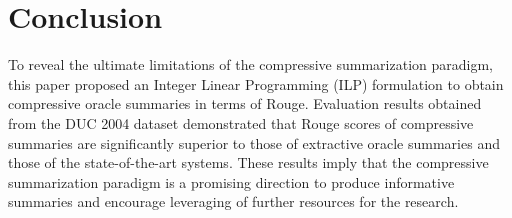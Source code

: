 \documentclass[11pt,a4paper]{article}
\begin{document}
\section{Conclusion}

To reveal the ultimate limitations of the compressive
summarization paradigm, this paper proposed an Integer Linear
Programming (ILP) formulation to obtain compressive oracle summaries in
terms of {\sc Rouge}.
Evaluation results obtained from the DUC 2004 dataset demonstrated that 
{\sc Rouge} scores of compressive summaries are significantly superior
to those of extractive oracle summaries and those of the
state-of-the-art systems. 
These results imply that the compressive summarization paradigm is a
promising direction to produce informative summaries and 
encourage leveraging of further resources for the research.
 


\end{document}
